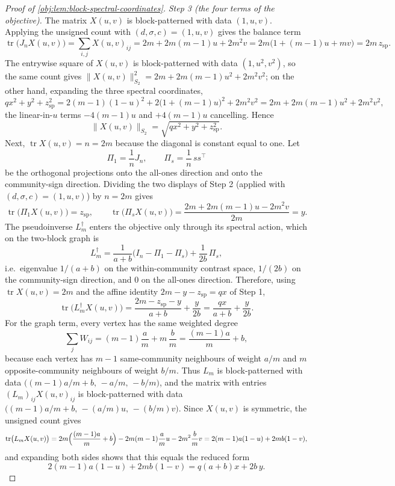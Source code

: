 \documentclass[11pt]{article}
\begin{document}
\begin{proof}[Proof of \cref{obj:lem:block-spectral-coordinates}]
\emph{Step 3 (the four terms of the objective).}  The matrix \(X(u,v)\) is block-patterned with data \((1,u,v)\).  Applying the unsigned count with \((d,\sigma,c)=(1,u,v)\) gives the balance term
\[
\operatorname{tr}\bigl(J_nX(u,v)\bigr)
=\sum_{i,j}X(u,v)_{ij}
=2m+2m(m-1)u+2m^2v
=2m\bigl(1+(m-1)u+mv\bigr)
=2m\,z_{\mathrm{sp}} .
\]
The entrywise square of \(X(u,v)\) is block-patterned with data \((1,u^2,v^2)\), so the same count gives \(\|X(u,v)\|_{S_2}^2=2m+2m(m-1)u^2+2m^2v^2\); on the other hand, expanding the three spectral coordinates,
\[
qx^2+y^2+z_{\mathrm{sp}}^2
=2(m-1)(1-u)^2+2\bigl(1+(m-1)u\bigr)^2+2m^2v^2
=2m+2m(m-1)u^2+2m^2v^2 ,
\]
the linear-in-\(u\) terms \(-4(m-1)u\) and \(+4(m-1)u\) cancelling.  Hence
\[
\|X(u,v)\|_{S_2}=\sqrt{qx^2+y^2+z_{\mathrm{sp}}^2}.
\]
Next, \(\operatorname{tr}X(u,v)=n=2m\) because the diagonal is constant equal to one.  Let
\[
\Pi_1=\frac{1}{n}J_n,
\qquad
\Pi_s=\frac{1}{n}\,ss^\top
\]
be the orthogonal projections onto the all-ones direction and onto the community-sign direction.  Dividing the two displays of Step 2 (applied with \((d,\sigma,c)=(1,u,v)\)) by \(n=2m\) gives
\[
\operatorname{tr}\bigl(\Pi_1X(u,v)\bigr)=z_{\mathrm{sp}},
\qquad
\operatorname{tr}\bigl(\Pi_sX(u,v)\bigr)
=\frac{2m+2m(m-1)u-2m^2v}{2m}
=y .
\]
The pseudoinverse \(L_m^\dagger\) enters the objective only through its spectral action, which on the two-block graph is
\[
L_m^\dagger
=\frac{1}{a+b}\bigl(I_n-\Pi_1-\Pi_s\bigr)+\frac{1}{2b}\,\Pi_s ,
\]
i.e.\ eigenvalue \(1/(a+b)\) on the within-community contrast space, \(1/(2b)\) on the community-sign direction, and \(0\) on the all-ones direction.  Therefore, using \(\operatorname{tr}X(u,v)=2m\) and the affine identity \(2m-y-z_{\mathrm{sp}}=qx\) of Step 1,
\[
\operatorname{tr}\bigl(L_m^\dagger X(u,v)\bigr)
=\frac{2m-z_{\mathrm{sp}}-y}{a+b}+\frac{y}{2b}
=\frac{qx}{a+b}+\frac{y}{2b}.
\]
For the graph term, every vertex has the same weighted degree
\[
\sum_{j}W_{ij}=(m-1)\frac{a}{m}+m\,\frac{b}{m}=\frac{(m-1)a}{m}+b ,
\]
because each vertex has \(m-1\) same-community neighbours of weight \(a/m\) and \(m\) opposite-community neighbours of weight \(b/m\).  Thus \(L_m\) is block-patterned with data \(\bigl((m-1)a/m+b,\,-a/m,\,-b/m\bigr)\), and the matrix with entries \((L_m)_{ij}X(u,v)_{ij}\) is block-patterned with data \(\bigl((m-1)a/m+b,\,-(a/m)u,\,-(b/m)v\bigr)\).  Since \(X(u,v)\) is symmetric, the unsigned count gives
\[
\operatorname{tr}\bigl(L_mX(u,v)\bigr)
=2m\Bigl(\frac{(m-1)a}{m}+b\Bigr)-2m(m-1)\frac{a}{m}u-2m^2\frac{b}{m}v
=2(m-1)a(1-u)+2mb(1-v),
\]
and expanding both sides shows that this equals the reduced form
\[
2(m-1)a(1-u)+2mb(1-v)=q(a+b)x+2b\,y .
\]


\end{proof}
\end{document}
